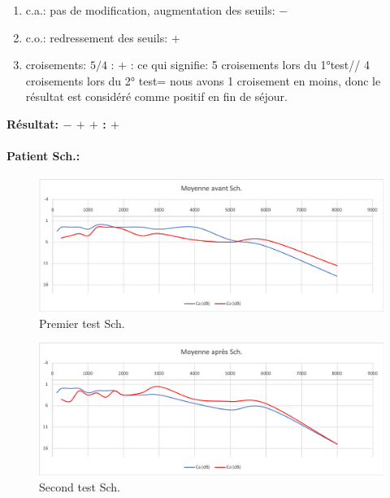 	\begin{enumerate}
 		\item  c.a.: pas de modification, augmentation des
                  seuils: $-$
 		\item  c.o.: redressement des seuils: $+$
 		\item  croisements: $5/4$ : $+$ : ce qui signifie:  5 croisements lors du 1°test// 4 croisements lors du 2° test= nous avons 1 croisement en moins, donc le résultat est considéré comme positif en fin
                  de séjour.
                \end{enumerate}

                \textbf{ Résultat:  $- $  $+ $   $+ $     :   $+$}

\paragraph{Patient Sch.:}
\begin{figure}[th]
\centering
\includegraphics[width=1\linewidth]{images/graphiques/schaff_pre.png}
\caption[Patient Sch. : 1° test]{Premier test Sch.}

\end{figure}


         \begin{figure}[th]
\centering
\includegraphics[width=1\linewidth]{images/graphiques/schaff_post.png}
\caption[Patient Sch.: 2° test]{Second test Sch.}

\label{groupecontroleimage1}
\end{figure}


